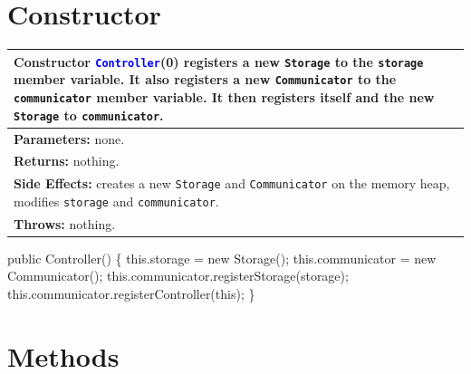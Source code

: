 \section{Constructor}
\begin{tabular}{p{\textwidth}}
\toprule
\rowcolor{TableTitle}
Constructor \textcolor{blue}{{\tt{}Controller}}(0) registers a new {\tt{}Storage} to
the {\tt{}storage} member variable. It also registers a new {\tt{}Communicator} to
the {\tt{}communicator} member variable. It then registers itself and the new
{\tt{}Storage} to {\tt{}communicator}.\\
\midrule
\textbf{Parameters:} none.\\
\textbf{Returns:} nothing.\\
\textbf{Side Effects:} creates a new {\tt{}Storage} and {\tt{}Communicator} on the
memory heap, modifies {\tt{}storage} and {\tt{}communicator}.\\
\textbf{Throws:} nothing.\\
\bottomrule
\end{tabular}
\nwenddocs{}\endmoddef{}
public Controller() \{
  this.storage = new Storage();
  this.communicator = new Communicator();
  this.communicator.registerStorage(storage);
  this.communicator.registerController(this);
\}
\nwendcode{}\nwdocspar

\section{Methods}

